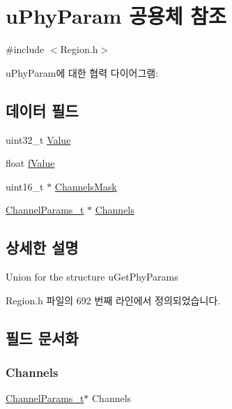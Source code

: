 \hypertarget{unionu_phy_param}{}\section{u\+Phy\+Param 공용체 참조}
\label{unionu_phy_param}


{\ttfamily \#include $<$Region.\+h$>$}



u\+Phy\+Param에 대한 협력 다이어그램\+:
\subsection*{데이터 필드}
\begin{DoxyCompactItemize}
\item 
uint32\+\_\+t \mbox{\hyperlink{unionu_phy_param_a8e0dcce3428a8051614e852b8836d0d1}{Value}}
\item 
float \mbox{\hyperlink{unionu_phy_param_ad30735f839c3c7592fc5bc5390c45715}{f\+Value}}
\item 
uint16\+\_\+t $\ast$ \mbox{\hyperlink{unionu_phy_param_aed7477cfc6166e3ee0499b898443426a}{Channels\+Mask}}
\item 
\mbox{\hyperlink{group___l_o_r_a_m_a_c_ga1360ca6f82c6d125ea43a9dad9b56184}{Channel\+Params\+\_\+t}} $\ast$ \mbox{\hyperlink{unionu_phy_param_afecbd1e457cbd79eb7072bd140ff33d4}{Channels}}
\end{DoxyCompactItemize}


\subsection{상세한 설명}
Union for the structure u\+Get\+Phy\+Params 

Region.\+h 파일의 692 번째 라인에서 정의되었습니다.



\subsection{필드 문서화}
\mbox{\label{unionu_phy_param_afecbd1e457cbd79eb7072bd140ff33d4}} 
\subsubsection{\texorpdfstring{Channels}{Channels}}
{\footnotesize\ttfamily \mbox{\hyperlink{group___l_o_r_a_m_a_c_ga1360ca6f82c6d125ea43a9dad9b56184}{Channel\+Params\+\_\+t}}$\ast$ Channels}

